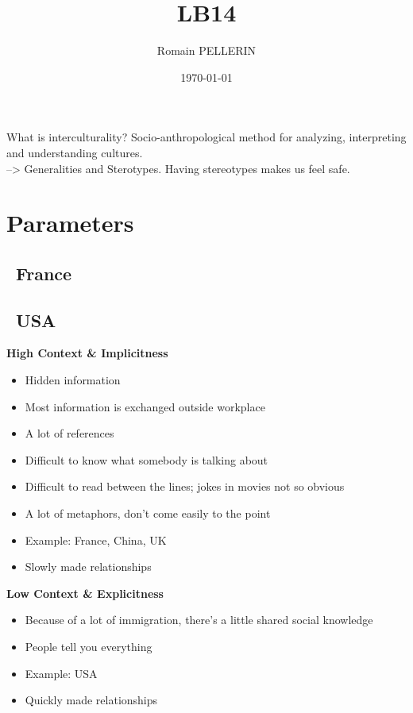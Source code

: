 \documentclass[11pt,a4paper,oneside,french,svgnames]{report}
\title{LB14}
\author{Romain PELLERIN}
\date\today
\begin{document}
\scriptsize

\centering What is interculturality? Socio-anthropological method for analyzing, interpreting and understanding cultures.\\
--> Generalities and Sterotypes. Having stereotypes makes us feel safe.

\section*{Parameters}

\begin{center}
\begin{minipage}[t]{.49\textwidth}
\centering\subsection*{~France}
\end{minipage}
\begin{minipage}[t]{.49\textwidth}
\centering\subsection*{~USA}
\end{minipage}

\begin{minipage}[t]{.49\textwidth}
\centering\textbf{High Context \& Implicitness}\\
  \begin{itemize}
    \item Hidden information
    \item Most information is exchanged outside workplace
    \item A lot of references
    \item Difficult to know what somebody is talking about
    \item Difficult to read between the lines; jokes in movies not so obvious
    \item A lot of metaphors, don't come easily to the point
    \item Example: France, China, UK
    \item Slowly made relationships
  \end{itemize}
\end{minipage}
\begin{minipage}[t]{.49\textwidth}
\centering\textbf{Low Context \& Explicitness}\\
  \begin{itemize}
    \item Because of a lot of immigration, there's a little shared social knowledge
    \item People tell you everything
    \item Example: USA
    \item Quickly made relationships
  \end{itemize}
\end{minipage}


\end{center}
\end{document}
